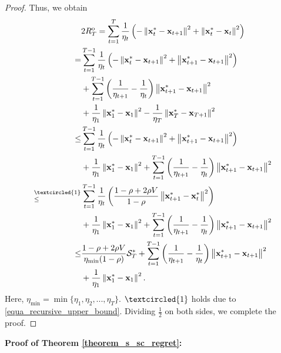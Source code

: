 \documentclass[journal]{IEEEtran}
\begin{document}
\begin{proof}
Thus, we obtain
\begin{align}
\nonumber
& 2R^{\mathrm{o}}_T = \sum\limits_{t=1}^{T} \frac{1}{\eta_t} \lrincir{-\lrnorm{\x_t^{\ast} - \x_{t+1}}^2   + \lrnorm { \x_t^{\ast} - \x_{t} }^2} \\ \nonumber
= & \sum\limits_{t=1}^{T-1} \frac{1}{\eta_t} \lrincir{-\lrnorm{\x_t^{\ast} - \x_{t+1}}^2   + \lrnorm { \x_{t+1}^{\ast} - \x_{t+1} }^2} \\ \nonumber 
& + \sum\limits_{t=1}^{T-1} \lrincir{\frac{1}{\eta_{t+1}} - \frac{1}{\eta_t}} \lrnorm { \x_{t+1}^{\ast} - \x_{t+1} }^2 \\ \nonumber 
& + \frac{1}{\eta_1} \lrnorm{\x_1^{\ast} - \x_1}^2 - \frac{1}{\eta_{T}}\lrnorm{\x_T^{\ast} - \x_{T+1}}^2 \\ \nonumber
\le & \sum\limits_{t=1}^{T-1} \frac{1}{\eta_t} \lrincir{-\lrnorm{\x_t^{\ast} - \x_{t+1}}^2   + \lrnorm { \x_{t+1}^{\ast} - \x_{t+1} }^2}  \\ \nonumber
& + \frac{1}{\eta_1} \lrnorm{\x_1^{\ast} - \x_1}^2 + \sum\limits_{t=1}^{T-1} \lrincir{\frac{1}{\eta_{t+1}} - \frac{1}{\eta_t}} \lrnorm { \x_{t+1}^{\ast} - \x_{t+1} }^2 \\ \nonumber
\refabovecir{\le}{\textcircled{1}} & \sum\limits_{t=1}^{T-1} \frac{1}{\eta_t} \lrincir{ \frac{1-\rho + 2\rho V}{1-\rho}\lrnorm {\x_{t+1}^{\ast} - \x_t^{\ast}}^2 } \\ \nonumber
& + \frac{1}{\eta_1} \lrnorm{\x_1^{\ast} - \x_1}^2 + \sum\limits_{t=1}^{T-1} \lrincir{\frac{1}{\eta_{t+1}} - \frac{1}{\eta_t}} \lrnorm { \x_{t+1}^{\ast} - \x_{t+1} }^2 \\ \nonumber
\le & \frac{1-\rho + 2\rho V}{\eta_{\min}(1-\rho)} \Scal_T^{\ast} + \sum\limits_{t=1}^{T-1} \lrincir{\frac{1}{\eta_{t+1}} - \frac{1}{\eta_t}} \lrnorm { \x_{t+1}^{\ast} - \x_{t+1} }^2 \\ \nonumber 
& + \frac{1}{\eta_1}\lrnorm{\x_1^{\ast} - \x_1}^2.
\end{align} Here, $\eta_{\min} = \min\{\eta_1, \eta_2 ,..., \eta_T\}$. $\textcircled{1}$ holds due to \eqref{equa_recursive_upper_bound}. Dividing $\frac{1}{2}$ on both sides, we complete the proof.
\end{proof}







\textbf{Proof of Theorem \ref{theorem_s_sc_regret}:}
\end{document}
